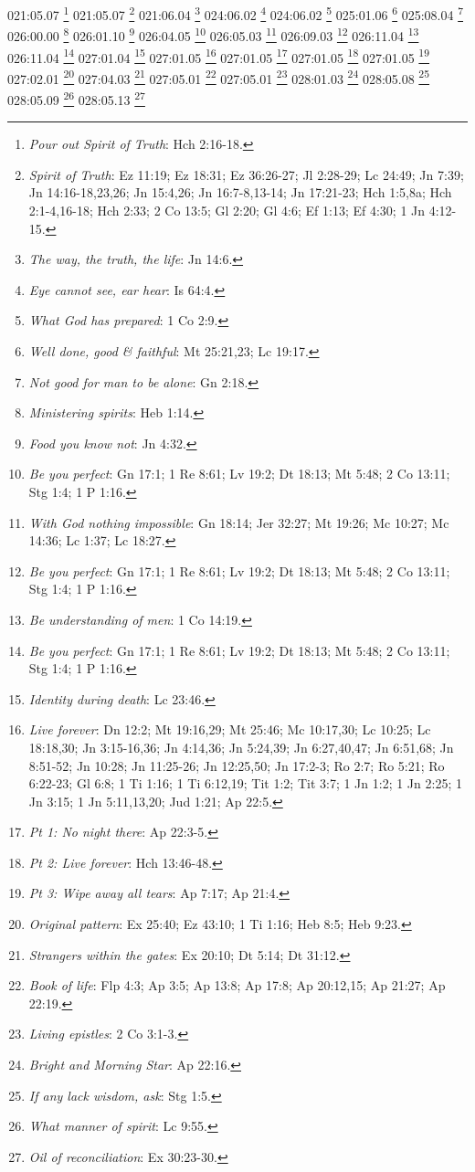 {{{{{{{{{{{{{{{{{{{021:05.07 \footnote{\textit{Pour out Spirit of Truth}: Hch 2:16-18.}
021:05.07 \footnote{\textit{Spirit of Truth}: Ez 11:19; Ez 18:31; Ez 36:26-27; Jl 2:28-29; Lc 24:49; Jn 7:39; Jn 14:16-18,23,26; Jn 15:4,26; Jn 16:7-8,13-14; Jn 17:21-23; Hch 1:5,8a; Hch 2:1-4,16-18; Hch 2:33; 2 Co 13:5; Gl 2:20; Gl 4:6; Ef 1:13; Ef 4:30; 1 Jn 4:12-15.}
021:06.04 \footnote{\textit{The way, the truth, the life}: Jn 14:6.}
024:06.02 \footnote{\textit{Eye cannot see, ear hear}: Is 64:4.}
024:06.02 \footnote{\textit{What God has prepared}: 1 Co 2:9.}
025:01.06 \footnote{\textit{Well done, good & faithful}: Mt 25:21,23; Lc 19:17.}
025:08.04 \footnote{\textit{Not good for man to be alone}: Gn 2:18.}
026:00.00 \footnote{\textit{Ministering spirits}: Heb 1:14.}
026:01.10 \footnote{\textit{Food you know not}: Jn 4:32.}
026:04.05 \footnote{\textit{Be you perfect}: Gn 17:1; 1 Re 8:61; Lv 19:2; Dt 18:13; Mt 5:48; 2 Co 13:11; Stg 1:4; 1 P 1:16.}
026:05.03 \footnote{\textit{With God nothing impossible}: Gn 18:14; Jer 32:27; Mt 19:26; Mc 10:27; Mc 14:36; Lc 1:37; Lc 18:27.}
026:09.03 \footnote{\textit{Be you perfect}: Gn 17:1; 1 Re 8:61; Lv 19:2; Dt 18:13; Mt 5:48; 2 Co 13:11; Stg 1:4; 1 P 1:16.}
026:11.04 \footnote{\textit{Be understanding of men}: 1 Co 14:19.}
026:11.04 \footnote{\textit{Be you perfect}: Gn 17:1; 1 Re 8:61; Lv 19:2; Dt 18:13; Mt 5:48; 2 Co 13:11; Stg 1:4; 1 P 1:16.}
027:01.04 \footnote{\textit{Identity during death}: Lc 23:46.}
027:01.05 \footnote{\textit{Live forever}: Dn 12:2; Mt 19:16,29; Mt 25:46; Mc 10:17,30; Lc 10:25; Lc 18:18,30; Jn 3:15-16,36; Jn 4:14,36; Jn 5:24,39; Jn 6:27,40,47; Jn 6:51,68; Jn 8:51-52; Jn 10:28; Jn 11:25-26; Jn 12:25,50; Jn 17:2-3; Ro 2:7; Ro 5:21; Ro 6:22-23; Gl 6:8; 1 Ti 1:16; 1 Ti 6:12,19; Tit 1:2; Tit 3:7; 1 Jn 1:2; 1 Jn 2:25; 1 Jn 3:15; 1 Jn 5:11,13,20; Jud 1:21; Ap 22:5.}
027:01.05 \footnote{\textit{Pt 1: No night there}: Ap 22:3-5.}
027:01.05 \footnote{\textit{Pt 2: Live forever}: Hch 13:46-48.}
027:01.05 \footnote{\textit{Pt 3: Wipe away all tears}: Ap 7:17; Ap 21:4.}
027:02.01 \footnote{\textit{Original pattern}: Ex 25:40; Ez 43:10; 1 Ti 1:16; Heb 8:5; Heb 9:23.}
027:04.03 \footnote{\textit{Strangers within the gates}: Ex 20:10; Dt 5:14; Dt 31:12.}
027:05.01 \footnote{\textit{Book of life}: Flp 4:3; Ap 3:5; Ap 13:8; Ap 17:8; Ap 20:12,15; Ap 21:27; Ap 22:19.}
027:05.01 \footnote{\textit{Living epistles}: 2 Co 3:1-3.}
028:01.03 \footnote{\textit{Bright and Morning Star}: Ap 22:16.}
028:05.08 \footnote{\textit{If any lack wisdom, ask}: Stg 1:5.}
028:05.09 \footnote{\textit{What manner of spirit}: Lc 9:55.}
028:05.13 \footnote{\textit{Oil of reconciliation}: Ex 30:23-30.}
}}}}}}}}}}}}}}}}}}}
